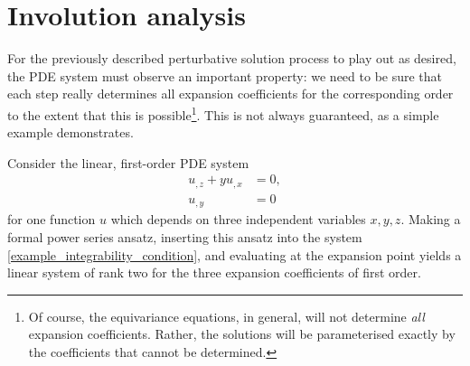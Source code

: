 \section{Involution analysis}\label{sect_involution}
For the previously described perturbative solution process to play out as desired, the PDE system must observe an important property: we need to be sure that each step really determines all expansion coefficients for the corresponding order to the extent that this is possible\footnote{Of course, the equivariance equations, in general, will not determine \emph{all} expansion coefficients. Rather, the solutions will be parameterised exactly by the coefficients that cannot be determined.}. This is not always guaranteed, as a simple example demonstrates.
\begin{example}\label{example_involution_1}
  Consider the linear, first-order PDE system
  \begin{equation}\label{example_integrability_condition}
    \begin{aligned}
      u_{,z} + y u_{,x} &{} = 0, \\
      u_{,y} &{} = 0
    \end{aligned}
  \end{equation}
  for one function $u$ which depends on three independent variables $x,y,z$. Making a formal power series ansatz, inserting this ansatz into the system \eqref{example_integrability_condition}, and evaluating at the expansion point yields a linear system of rank two for the three expansion coefficients of first order.


\end{example}
